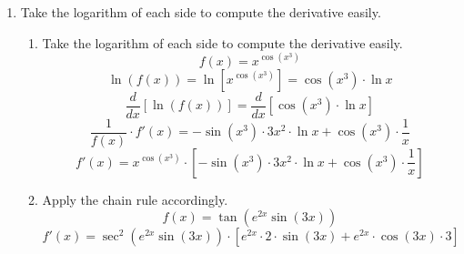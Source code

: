 \documentclass[a4paper, 12pt]{article}
\begin{document}
\begin{enumerate}[leftmargin=*,label=\textbf{\arabic*.}]
\begin{enumerate}[leftmargin=*,label=\textbf{\alph*.}]
\item Factor each side of the fraction and eliminate like terms.
\[\lim_{x\to3}\frac{x^2-9}{x^2-x-6}=\lim_{x\to3}\frac{(x-3)(x+3)}{(x-3)(x+2)}=\lim_{x\to3}\frac{x+3}{x+2}=\boxed{\frac65}\]

\item The expression is in the form $\infty-\infty$. Expand the expression by multiplying by its conjugate to eliminate the indetermination.
\begin{align*}
\lim_{x\to-\infty}\sqrt{x^2-4x}+x&=\lim_{x\to-\infty}\left[\left(\sqrt{x^2-4x} + x\right) \cdot\frac{\sqrt{x^2-4x}-x}{\sqrt{x^2-4x}-x}\right]\\[1em]&=\lim_{x\to-\infty}\frac{x^2-4x-x^2}{\sqrt{x^2-4x}-x}\\[1em]&=\lim_{x\to-\infty}\frac{-4x}{\sqrt{x^2-4x}-x}=\lim_{x\to-\infty}\frac{-4x}{\displaystyle |x|\sqrt{1-\frac4x}-x}\\[1em]&=\lim_{x\to-\infty}\frac{-4}{\displaystyle-\sqrt{1-\frac4x}-1}=\lim_{x\to-\infty}\frac42=\boxed{2}\end{align*}

\item Recall the definition of the derivative of a function at a point. Let $f$ be a differentiable function, then
\[\lim_{h\to 0} \frac{f(x+h)-f(x)}{h} = f'(x)\]

If we set $f(x) = x^{123}$, then we can differentiate $f$ at $x=1$.
\[\lim_{h\to0}\frac{(1+h)^{123}-1}{h}=f'(1)=123\cdot(1)^{122} = \boxed{123}\]
\end{enumerate}

\item Take the logarithm of each side to compute the derivative easily.
\begin{enumerate}[leftmargin=*,label=\textbf{\alph*.}]
\item Take the logarithm of each side to compute the derivative easily.
\[f(x)=x^{\cos\left(x^3\right)}\]
\[\ln(f(x))=\ln\left[x^{\cos\left(x^3\right)}\right]=\cos\left(x^3\right)\cdot\ln x\]
\[\frac{d}{dx}\left[\ln(f(x))\right] = \frac{d}{dx}\left[\cos\left(x^3\right)\cdot\ln x\right]\]
\[\frac{1}{f(x)}\cdot f'(x) = -\sin\left(x^3\right)\cdot 3x^2 \cdot \ln x + \cos\left(x^3\right)\cdot\frac1x\]
\[\boxed{f'(x) = x^{\cos\left(x^3\right)}\cdot\left[-\sin\left(x^3\right)\cdot 3x^2 \cdot \ln x + \cos\left(x^3\right)\cdot\frac1x\right]}\]

\item Apply the chain rule accordingly.
\begin{equation*}f(x) = \tan\left( e^{2x}\sin(3x)\right)\end{equation*}
\begin{equation*}\boxed{f'(x) = \sec^2\left( e^{2x}\sin(3x)\right)\cdot\left[ e^{2x}\cdot 2\cdot\sin(3x) +  e^{2x}\cdot\cos(3x)\cdot3\right]}\end{equation*}


\end{enumerate}
\end{enumerate}
\end{document}
